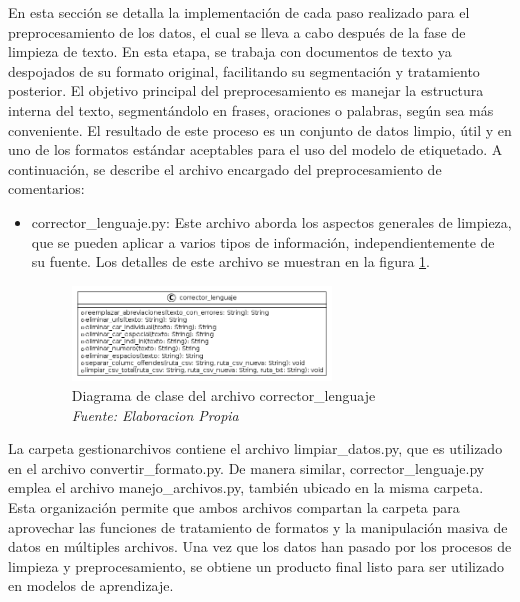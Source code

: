 En esta sección se detalla la implementación de cada paso realizado para el preprocesamiento de los datos, el cual se lleva a cabo después de la fase de limpieza de texto. En esta etapa, se trabaja con documentos de texto ya despojados de su formato original, facilitando su segmentación y tratamiento posterior. El objetivo principal del preprocesamiento es manejar la estructura interna del texto, segmentándolo en frases, oraciones o palabras, según sea más conveniente. El resultado de este proceso es un conjunto de datos limpio, útil y en uno de los formatos estándar aceptables para el uso del modelo de etiquetado. A continuación, se describe el archivo encargado del preprocesamiento de comentarios:

\begin{itemize}

\item corrector\_lenguaje.py: Este archivo aborda los aspectos generales de limpieza, que se pueden aplicar a varios tipos de información, independientemente de su fuente. Los detalles de este archivo se muestran en la figura \ref{fig:uml2}.

\begin{figure}[h!]
	\includegraphics[width=0.65\textwidth]{capitulo5/figuras/fig2.png}
	\caption[Diagrama de clase del archivo corrector\_lenguaje]{Diagrama de clase del archivo corrector\_lenguaje
		\\\textit{Fuente: Elaboracion Propia}}
	\label{fig:uml2}
\end{figure}

\end{itemize}

La carpeta gestionarchivos contiene el archivo limpiar\_datos.py, que es utilizado en el archivo convertir\_formato.py. De manera similar, corrector\_lenguaje.py emplea el archivo manejo\_archivos.py, también ubicado en la misma carpeta. Esta organización permite que ambos archivos compartan la carpeta para aprovechar las funciones de tratamiento de formatos y la manipulación masiva de datos en múltiples archivos.
Una vez que los datos han pasado por los procesos de limpieza y preprocesamiento, se obtiene un producto final listo para ser utilizado en modelos de aprendizaje.


